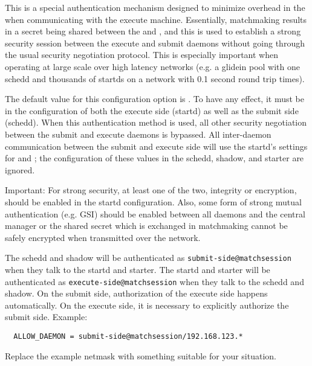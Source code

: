 \begin{description}
\label{param:SecEnableMatchPasswordAuthentication}
\item[\Macro{SEC\_ENABLE\_MATCH\_PASSWORD\_AUTHENTICATION}]
  This is a special authentication mechanism designed to minimize
  overhead in the  when communicating with the execute
  machine.  Essentially, matchmaking results in a secret being shared
  between the  and , and this is used to
  establish a strong security session between the execute and submit
  daemons without going through the usual security negotiation protocol.
  This is especially important when operating at large scale over high
  latency networks (e.g. a glidein pool with one schedd and thousands of
  startds on a network with 0.1 second round trip times).

  The default value for this configuration option is .  To
  have any effect, it must be  in the configuration of both
  the execute side (startd) as well as the submit side (schedd).  When
  this authentication method is used, all other security negotiation
  between the submit and execute daemons is bypassed.  All inter-daemon
  communication between the submit and execute side will use the
  startd's settings for  and
  ; the configuration of these values in
  the schedd, shadow, and starter are ignored.

  Important: For strong security, at least one of the two, integrity or
  encryption, should be enabled in the startd configuration.  Also, some
  form of strong mutual authentication (e.g. GSI) should be enabled
  between all daemons and the central manager or the shared secret which
  is exchanged in matchmaking cannot be safely encrypted when transmitted
  over the network.

  The schedd and shadow will be authenticated as
  \verb|submit-side@matchsession| when they talk to the startd and
  starter.  The startd and starter will be authenticated as
  \verb|execute-side@matchsession| when they talk to the schedd and
  shadow.  On the submit side, authorization of the execute side happens
  automatically.  On the execute side, it is necessary to explicitly
  authorize the submit side.  Example:

\begin{verbatim}
  ALLOW_DAEMON = submit-side@matchsession/192.168.123.*
\end{verbatim}

  Replace the example netmask with something suitable for your situation.


\end{description}
